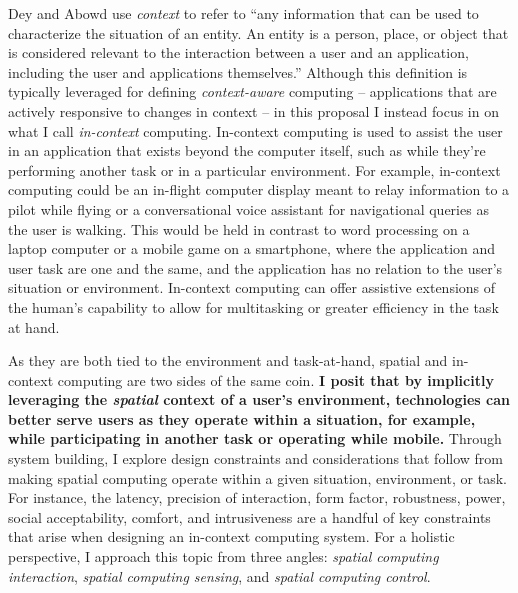 \documentclass [11pt, proquest] {uwthesis}[2020/02/24]
\begin{document}
 
 
Dey and Abowd use \textit{context} to refer to ``any information that can be used to characterize the situation of an entity. An entity is a person, place, or object that is considered relevant to the interaction between a user and an application, including the user and applications themselves.'' Although this definition is typically leveraged for defining \textit{context-aware} computing -- applications that are actively responsive to changes in context -- in this proposal I instead focus in on what I call \textit{in-context} computing. In-context computing is used to assist the user in an application that exists beyond the computer itself, such as while they're performing another task or in a particular environment. For example, in-context computing could be an in-flight computer display meant to relay information to a pilot while flying or a conversational voice assistant for navigational queries as the user is walking. This would be held in contrast to word processing on a laptop computer or a mobile game on a smartphone, where the application and user task are one and the same, and the application has no relation to the user’s situation or environment. In-context computing can offer assistive extensions of the human’s capability to allow for multitasking or greater efficiency in the task at hand. 
 
 
 
As they are both tied to the environment and task-at-hand, spatial and in-context computing are two sides of the same coin. \textbf{I posit that by implicitly leveraging the \textit{spatial} context of a user’s environment, technologies can better serve users as they operate within a situation, for example, while participating in another task or operating while mobile.} Through system building, I explore design constraints and considerations that follow from making spatial computing operate within a given situation, environment, or task. For instance, the latency, precision of interaction, form factor, robustness, power, social acceptability, comfort, and intrusiveness are a handful of key constraints that arise when designing an in-context computing system. For a holistic perspective, I approach this topic from three angles: \textit{spatial computing interaction}, \textit{spatial computing sensing}, and \textit{spatial computing control}.
\end{document}
